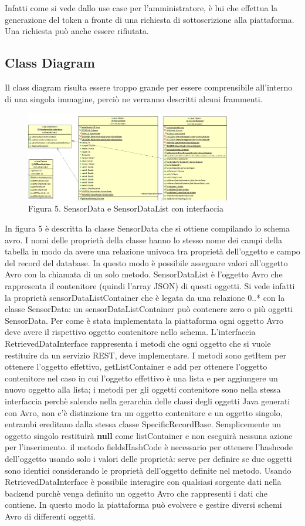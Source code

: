 Infatti come si vede dallo use case per l’amministratore, è lui che effettua la generazione del token a fronte di una richiesta di sottoscrizione alla piattaforma. Una richiesta può anche essere rifiutata.
\clearpage
\subsection{Class Diagram}
Il class diagram risulta essere troppo grande per essere comprensibile all’interno di una singola immagine, perciò ne verranno descritti alcuni frammenti. \par
\begin{figure}[h]
	\centering
	\includegraphics[width=0.8\textwidth]{sensor-data.png}
	\caption*{Figura 5. SensorData e SensorDataList con interfaccia}
\end{figure}
In figura 5 è descritta la classe SensorData che si ottiene compilando lo schema avro. I nomi delle proprietà della classe hanno lo stesso nome dei campi della tabella in modo da avere una relazione univoca tra proprietà dell’oggetto e campo del record del database. In questo modo è possibile assegnare valori all’oggetto Avro con la chiamata di un solo metodo. SensorDataList è l’oggetto Avro che rappresenta il contenitore (quindi l’array JSON) di questi oggetti. Si vede infatti la proprietà sensorDataListContainer che è legata da una relazione 0..* con la classe SensorData: un sensorDataListContainer può contenere zero o più oggetti SensorData. Per come è stata implementata la piattaforma ogni oggetto Avro deve avere il rispettivo oggetto contenitore nello schema. L’interfaccia RetrievedDataInterface rappresenta i metodi che ogni oggetto che si vuole restituire da un servizio REST, deve implementare. I metodi sono getItem per ottenere l’oggetto effettivo, getListContainer e add per ottenere l’oggetto contenitore nel caso in cui l’oggetto effettivo è una lista e per aggiungere un nuovo oggetto alla lista; i metodi per gli oggetti contenitore sono nella stessa interfaccia perchè salendo nella gerarchia delle classi degli oggetti Java generati con Avro, non c’è distinzione tra un oggetto contenitore e un oggetto singolo, entrambi ereditano dalla stessa classe SpecificRecordBase. Semplicemente un oggetto singolo restituirà \textbf{null} come listContainer e non eseguirà nessuna azione per l'inserimento. il metodo fieldsHashCode è necessario per ottenere l’hashcode dell’oggetto usando solo i valori delle proprietà: serve per definire se due oggetti sono identici considerando le proprietà dell'oggetto definite nel metodo. Usando RetrievedDataInterface è possibile interagire con qualsiasi sorgente dati nella backend purchè venga definito un oggetto Avro che rappresenti i dati che contiene. In questo modo la piattaforma può evolvere e gestire diversi schemi Avro di differenti oggetti.
